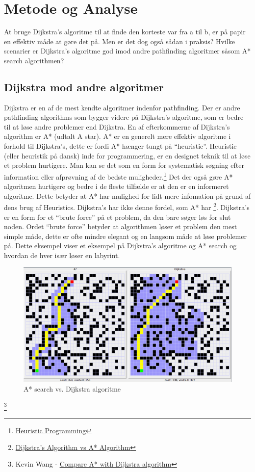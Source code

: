 \documentclass[12pt]{article}
\begin{document}
\section{Metode og Analyse}
At bruge Dijkstra's algoritme til at finde den korteste var fra a til b, er på papir en effektiv måde at gøre det på. Men er det dog også sådan i praksis? Hvilke scenarier er Dijkstra's algoritme god imod andre pathfinding algoritmer såsom A* search algorithmen? 
\subsection{Dijkstra mod andre algoritmer}
Dijkstra er en af de mest kendte algoritmer indenfor pathfinding. 
Der er andre pathfinding algorithms som bygger videre på Dijkstra’s algoritme, 
som er bedre til at løse andre problemer end Dijkstra. En af efterkommerne af Dijkstra’s algorithm er A* 
(udtalt A star). A* er en generelt mere effektiv algoritme i forhold til Dijkstra’s, 
dette er fordi A* hænger tungt på “heuristic”. Heuristic (eller heuristik på dansk) inde for programmering, 
er en designet teknik til at løse et problem hurtigere. Man kan se det som en form for systematisk søgning 
efter information eller afprøvning af de bedste muligheder.\footnote{\href{https://softjourn.com/insights/heuristic-programming}{Heuristic Programming}} Det der også gøre A* algoritmen hurtigere 
og bedre i de fleste tilfælde er at den er en informeret algoritme. Dette betyder at A* har mulighed for lidt 
mere infomation på grund af dens brug af Heuristics. Dijkstra’s har ikke denne fordel, som A* har \footnote{\href{https://stackabuse.com/dijkstras-algorithm-vs-a-algorithm/}{Dijkstra's Algorithm vs A* Algorithm}}. Dijkstra’s 
er en form for et “brute force” på et problem, da den bare søger løs for slut noden. 
Ordet “brute force” betyder at algorithmen løser et problem den mest simple måde, dette er ofte mindre elegant og en langsom måde at løse problemer på. 
Dette eksempel viser et eksempel på Dijkstra’s algoritme og A* 
search og hvordan de hver især løser en labyrint.  
\begin{figure}[ht]
  \includegraphics[width=\textwidth]{AstarvsDjikstra.png}
  \caption{A* search vs. Dijkstra algoritme}\label{A*vsDjikstra}
\end{figure}\footnote{Kevin Wang - \href{http://plainaslife.blogspot.com/2015/02/compare-with-dijkstra-algorithm.html}{Compare A* with Dijkstra algorithm}}
\end{document}
